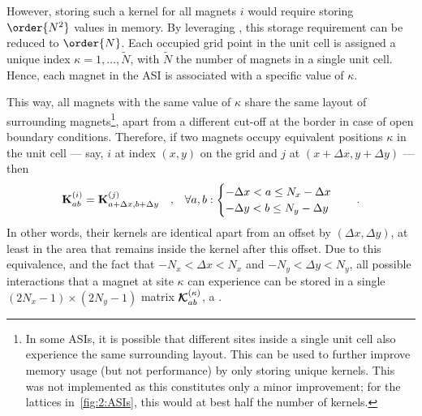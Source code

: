 However, storing such a kernel for all magnets $i$ would require storing $\order{N^2}$ values in memory. %
By leveraging , this storage requirement can be reduced to $\order{N}$.
Each occupied grid point in the unit cell is assigned a unique index $\kappa = 1,\dots,\widetilde{N}$, with $\widetilde{N}$ the number of magnets in a single unit cell.
Hence, each magnet in the ASI is associated with a specific value of $\kappa$. \par
This way, all magnets with the same value of $\kappa$ share the same layout of surrounding magnets\footnote{
	In some ASIs, it is possible that different sites inside a single unit cell also experience the same surrounding layout.
	This can be used to further improve memory usage (but not performance) by only storing unique kernels.
	This was not implemented as this constitutes only a minor improvement; for the lattices in~\cref{fig:2:ASIs}, this would at best half the number of kernels.
}, apart from a different cut-off at the border in case of open boundary conditions.
Therefore, if two magnets occupy equivalent positions $\kappa$ in the unit cell --- say, $i$ at index $(x,y)$ on the grid and $j$ at $(x+\Delta x, y+\Delta y)$ --- then
\begin{equation}
	\label{eq:2:Kernel_equivalence}
	\boldsymbol{\mathbf{K}}^{(i)}_{ab} = \boldsymbol{\mathbf{K}}^{(j)}_{a+\Delta x,b+\Delta y} \quad \mathrm{,} \quad \forall a,b:
	\begin{cases}
		-\Delta x < a \leq N_x - \Delta x \\
		-\Delta y < b \leq N_y - \Delta y \\
	\end{cases} \quad\mathrm{.}
\end{equation}
In other words, their kernels are identical apart from an offset by $(\Delta x, \Delta y)$, at least in the area that remains inside the kernel after this offset.
Due to this equivalence, and the fact that $- N_x < \Delta x < N_x$ and $- N_y < \Delta y < N_y$, all possible interactions that a magnet at site $\kappa$ can experience can be stored in a single $(2N_x-1) \times (2N_y-1)$ matrix $\boldsymbol{\mathbf{\mathcal{K}}}^{(\kappa)}_{ab}$, a .


